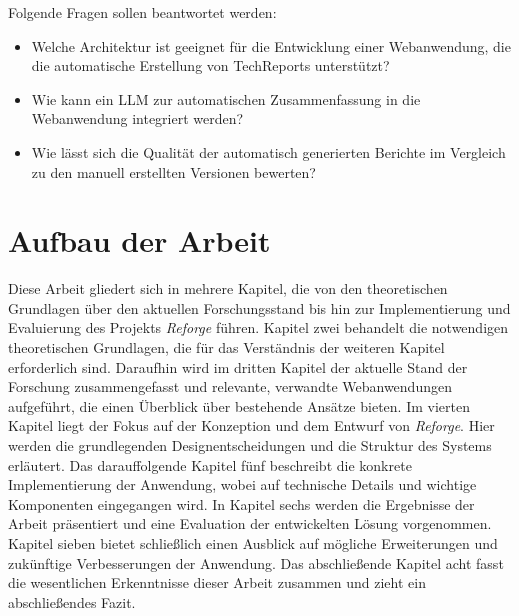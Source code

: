 Folgende Fragen sollen beantwortet werden:
\label{kernfragen}
\begin{itemize}
    \item Welche Architektur ist geeignet für die Entwicklung einer Webanwendung, die die automatische Erstellung von TechReports unterstützt?
    \item Wie kann ein \ac{LLM} zur automatischen Zusammenfassung in die Webanwendung integriert werden?
    \item Wie lässt sich die Qualität der automatisch generierten Berichte im Vergleich zu den manuell erstellten Versionen bewerten?
\end{itemize}

\section{Aufbau der Arbeit}

Diese Arbeit gliedert sich in mehrere Kapitel, die von den theoretischen Grundlagen über den aktuellen Forschungsstand bis hin zur Implementierung und Evaluierung des Projekts \textit{Reforge} führen. Kapitel zwei behandelt die notwendigen theoretischen Grundlagen, die für das Verständnis der weiteren Kapitel erforderlich sind. Daraufhin wird im dritten Kapitel der aktuelle Stand der Forschung zusammengefasst und relevante, verwandte Webanwendungen aufgeführt, die einen Überblick über bestehende Ansätze bieten. Im vierten Kapitel liegt der Fokus auf der Konzeption und dem Entwurf von \textit{Reforge}. Hier werden die grundlegenden Designentscheidungen und die Struktur des Systems erläutert. Das darauffolgende Kapitel fünf beschreibt die konkrete Implementierung der Anwendung, wobei auf technische Details und wichtige Komponenten eingegangen wird. In Kapitel sechs werden die Ergebnisse der Arbeit präsentiert und eine Evaluation der entwickelten Lösung vorgenommen. Kapitel sieben bietet schließlich einen Ausblick auf mögliche Erweiterungen und zukünftige Verbesserungen der Anwendung. Das abschließende Kapitel acht fasst die wesentlichen Erkenntnisse dieser Arbeit zusammen und zieht ein abschließendes Fazit.
